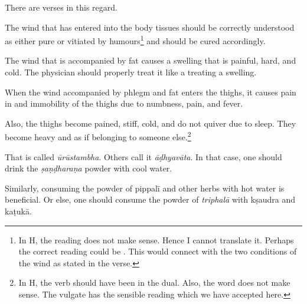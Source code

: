 \begin{translation}
\begin{tt}
\item[29]

There are verses in this regard.

\begin{sloka}
The wind that has entered into the body tissues should be correctly
understood as either pure or vitiated by humours\footnote{In H, the
    reading  does not make sense. Hence I cannot
    translate it. Perhaps the correct reading could be
    . This would connect with the two conditions of
    the wind as stated in the verse.} and should be cured accordingly.
\end{sloka}

\item[30]

\begin{sloka}
The wind that is accompanied by fat causes a swelling that is painful,
hard, and cold. The physician should properly treat it like a treating
a swelling.
\end{sloka}

\item[31]

\begin{sloka}
When the wind accompanied by phlegm and fat enters the thighs, it
causes pain in and immobility of the thighs due to numbness, pain, and
fever.
\end{sloka}

\item[32]

\begin{sloka}
Also, the thighs become pained, stiff, cold, and do not quiver due to
sleep. They become heavy and as if belonging to someone
else.\footnote{In H, the verb  should have been in the
    dual. Also, the word  does not make sense. The vulgate
    has the sensible reading  which we have accepted here.}
\end{sloka}

\item[33]

\begin{sloka}
That is called \textit{ūrūstambha}. Others call it \textit{āḍhyavāta}.
In that case, one should drink the \textit{ṣaṇḍharaṇa} powder with
cool water.
\end{sloka}

\item[34]

\begin{sloka}
Similarly, consuming the powder of \gls{pippalī} and other herbs with
hot water is beneficial. Or else, one should consume the powder of
\textit{triphalā} with \gls{kṣaudra} and \gls{kaṭukā}.
\end{sloka}


\end{tt}
\end{translation}
